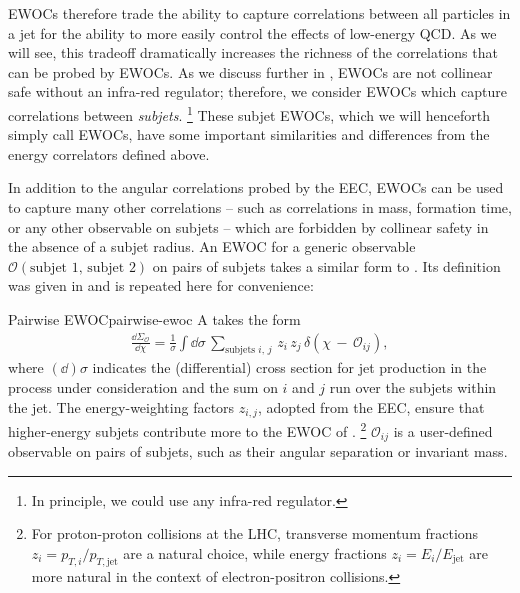 EWOCs therefore trade the ability to capture correlations between all particles in a jet for the ability to more easily control the effects of low-energy QCD.
%
As we will see, this tradeoff dramatically increases the richness of the correlations that can be probed by EWOCs.
As we discuss further in , EWOCs are not collinear safe without an infra-red regulator;
%
therefore, we consider EWOCs which capture correlations between \textit{subjets}.%
\footnote{
    In principle, we could use any infra-red regulator.
}
%
These subjet EWOCs, which we will henceforth simply call EWOCs, have some important similarities and differences from the energy correlators defined above.



In addition to the angular correlations probed by the EEC, EWOCs can be used to capture many other correlations -- such as correlations in mass, formation time, or any other observable on subjets -- which are forbidden by collinear safety in the absence of a subjet radius.
%
An EWOC for a generic observable \(\mathcal{O}(\text{subjet 1, subjet 2})\) on pairs of subjets takes a similar form to .
%
Its definition was given in  and is repeated here for convenience:
%
\begin{definitionbox}{Pairwise EWOC}{pairwise-ewoc}
    A  takes the form
    \begin{align}
        \label{eq:intro_ewoc_def}
        \frac{\dd \Sigma_\mathcal{O}}{\dd \chi}
        =
        \frac{1}{\sigma}
        \int \dd\sigma \,
        \sum_{
            \text{subjets }
            i,\, j
        } \,
        z_i \, z_j \,
        \delta\left(\chi \, - \, \mathcal{O}_{ij}\right)
        ,
    \end{align}
    where \((\dd)\sigma\) indicates the (differential) cross section for jet production in the process under consideration and the sum on \(i\) and \(j\) run over the subjets within the jet.
    The energy-weighting factors \(z_{i,j}\), adopted from the EEC, ensure that higher-energy subjets contribute more to the EWOC of .%
    \footnote{
        For proton-proton collisions at the LHC, transverse momentum fractions \(z_i = p_{T,i}/p_{T,\text{jet}}\) are a natural choice, while energy fractions \(z_{i} = E_{i}/E_\text{jet}\) are more natural in the context of electron-positron collisions.
    }
    \(\mathcal{O}_{ij}\) is a user-defined  observable on pairs of subjets, such as their angular separation or invariant mass.
\end{definitionbox}



